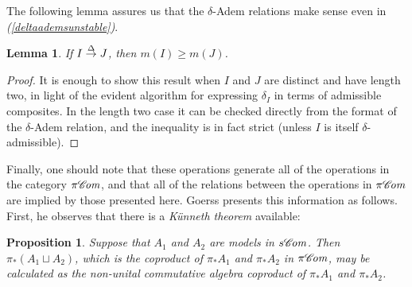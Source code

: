 \documentclass[11pt]{amsart} \renewcommand{\baselinestretch}{1.2}
\theoremstyle{plain}
\newtheorem{lem}[thm]{Lemma}
\newtheorem{prop}[thm]{Proposition}
\numberwithin{equation}{section} %
\theoremstyle{plain}
\newtheorem{lem}[thm]{Lemma}
\newtheorem{prop}[thm]{Proposition}
\numberwithin{equation}{chapter} %
\renewcommand{\to}{\longrightarrow}
\newcommand{\scrC}{\mathscr{C}}
\newcommand{\citeBOX}[2][]{\cite[\mbox{#1}]{#2}}
\newcommand{\deltaalg}{\Delta} %
\newcommand{\PA}[1]{\pi#1}
\newcommand{\minDimDelta}{m}
\newcommand{\produces}[3]{#3:#1\sim #2}
\renewcommand{\produces}[3]{#1\rightarrow_{#3} #2}%
\renewcommand{\produces}[3]{#1\overset{\smash{#3}}{\rightarrow} #2}%
\newcommand{\algs}{{\scrC\!\textit{\normalfont\textit{om}}}}
\begin{document}
\begin{Constructing homotopy operations}
The following lemma assures us that the $\delta$-Adem relations make sense even in \emph{(\ref{deltaademsunstable})}.
\begin{lem}
\label{lemOnAdemChangeInMDeltaPlain}
If $\produces{I}{J}{\deltaalg}$, then $\minDimDelta(I)\geq\minDimDelta(J)$.
\end{lem}
\begin{proof}
It is enough to show this result when $I$ and $J$ are distinct and have length two, in light of the evident algorithm for expressing $\delta_I$ in terms of admissible composites. In the length two case it can be checked directly from the format of the $\delta$-Adem relation, and the inequality is in fact strict (unless $I$ is itself $\delta$-admissible).
\end{proof}
Finally, one should note that these operations generate all of the operations in the category $\PA{\algs}$, and that all of the relations between the operations in $\PA{\algs}$ are implied by those presented here. Goerss \citeBOX[\S2]{MR1089001} presents this information as follows. First, he observes that there is a \emph{K\"unneth theorem} available:
\begin{prop}
\label{salgs homotopy kunneth}
Suppose that $A_1$ and $A_2$ are models in $s\algs$. Then $\pi_*(A_1\sqcup A_2)$, which is the coproduct of $\pi_*A_1$ and $\pi_*A_2$ in $\PA{\algs}$, may be calculated as the non-unital commutative algebra coproduct of $\pi_*A_1$ and $\pi_*A_2$.
\end{prop}

\end{Constructing homotopy operations}
\end{document}
